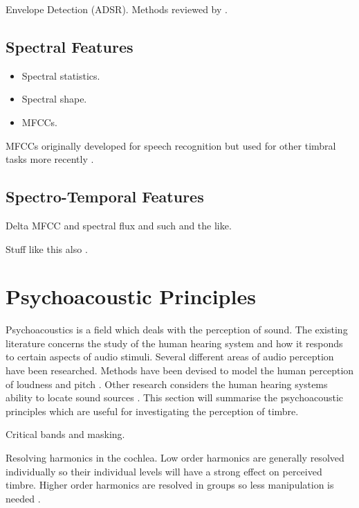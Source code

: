 		\note
		{
			Envelope Detection (ADSR). Methods reviewed by \citet{chang2007a}.
		}

	\subsection{Spectral Features}
	\label{sec:Timbre-LowLevelFeatures-Spectral}
		\note
		{
			\begin{itemize}
				\item Spectral statistics.
				\item Spectral shape.
				\item MFCCs.
			\end{itemize}

			MFCCs originally developed for speech recognition \citep{davis1980comparison} but used for other
			timbral tasks more recently \citep{depoli1997sonological}.
		}

	\subsection{Spectro-Temporal Features}
	\label{sec:Timbre-LowLevelFeatures-Spectrotemporal}
		\note
		{
			Delta MFCC and spectral flux and such and the like.
		}

	\note
	{
		Stuff like this also \citep{freed1990auditory, lakatos2000a}.
	}
	
\section{Psychoacoustic Principles}
\label{sec:Timbre-PsychoacousticPrinciples}
	Psychoacoustics is a field which deals with the perception of sound. The existing literature concerns the study of
	the human hearing system and how it responds to certain aspects of audio stimuli. Several different areas of audio
	perception have been researched. Methods have been devised to model the human perception of loudness
	\citep{moore1997a} and pitch \citep{gerhard2003pitch}. Other research considers the human hearing systems ability to
	locate sound sources \citep{blauert1997spatial}. This section will summarise the psychoacoustic principles which are
	useful for investigating the perception of timbre. 

	\note
	{
		Critical bands and masking.

		Resolving harmonics in the cochlea. Low order harmonics are generally resolved individually so their
		individual levels will have a strong effect on perceived timbre. Higher order harmonics are resolved in
		groups so less manipulation is needed \citep{howard2009acoustics}.
	}

